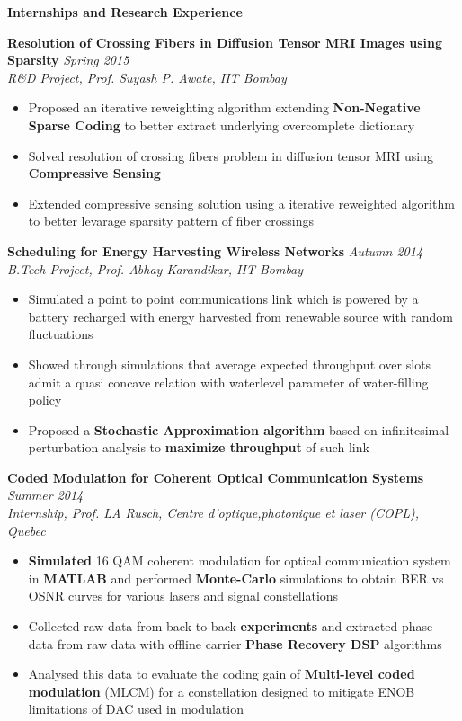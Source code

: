 \documentclass[a4paper,10pt]{article}
\newcommand{\resheading}[1]{
	{\large \colorbox{mygrey}{\begin{minipage}{\textwidth}{\textbf{#1 \vphantom{p\^{E}}}}\end{minipage}}}
}
\newcommand{\ressubheadingWithGuide}[3]{%

	\textbf{#1} \hfill \textit{#2}\null\\
	\textit{\small #3} %
	\vspace{-4pt}
}
\begin{document}
\resheading{Internships and Research Experience}
	\ressubheadingWithGuide{Resolution of Crossing Fibers in Diffusion Tensor MRI Images using Sparsity}{Spring 2015}{R\&D Project, Prof. Suyash P. Awate, IIT Bombay}
	\begin{itemize} \itemsep -1pt
		\item Proposed an iterative reweighting algorithm extending \textbf{Non-Negative Sparse Coding} to better extract underlying overcomplete dictionary
		\item Solved resolution of crossing fibers problem in diffusion tensor MRI using \textbf{Compressive Sensing}
		\item Extended compressive sensing solution using a iterative reweighted algorithm to better levarage sparsity pattern of fiber crossings
	\end{itemize}

	\ressubheadingWithGuide{Scheduling for Energy Harvesting Wireless Networks}{Autumn 2014}{B.Tech Project, Prof. Abhay Karandikar, IIT Bombay}
	\begin{itemize} \itemsep -1pt
		\item Simulated a point to point communications link which is powered by a battery recharged with energy harvested from renewable source with random fluctuations
		\item Showed through simulations that average expected throughput over slots admit a quasi concave relation with waterlevel parameter of water-filling policy
		\item Proposed a \textbf{Stochastic Approximation algorithm} based on infinitesimal perturbation analysis to \textbf{maximize throughput} of such link
	\end{itemize}
 
	\ressubheadingWithGuide{Coded Modulation for Coherent Optical Communication Systems}{Summer 2014}{Internship, Prof. LA Rusch, Centre d'optique,photonique et laser (COPL), Quebec}
    	\begin{itemize}\itemsep -1pt
      		\item \textbf{Simulated} 16 QAM coherent modulation for optical communication system in \textbf{MATLAB} and performed \textbf{Monte-Carlo} simulations to obtain BER vs OSNR curves for various lasers and signal constellations
			\item Collected raw data from back-to-back \textbf{experiments} and extracted phase data from raw data with offline carrier \textbf{Phase Recovery DSP} algorithms
			\item Analysed this data to evaluate the coding gain of \textbf{Multi-level coded modulation} (MLCM) for a constellation designed to mitigate ENOB limitations of DAC used in modulation
		\end{itemize}
\end{document}
